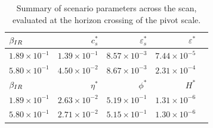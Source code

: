 
\begin{table}[h!]
  \begin{center}
    \begin{tabular}{lrrrr}
        \toprule
        $\beta_{IR}$ &    $c_s^{*}$ &  $\varepsilon_s^{*}$ &   $\varepsilon^{*}$ \\
        \midrule
        $1.89\times 10^{-1}$  &  $1.39\times 10^{-1}$  &  $  8.57\times 10^{-3}$  &  $7.44\times 10^{-5}$  \\
        $5.80\times 10^{-1}$  &  $4.50\times 10^{-2}$  &  $  8.67\times 10^{-3}$  &  $2.31\times 10^{-4}$  \\
        \bottomrule
        $\beta_{IR}$ &    $\eta^{*}$ &  $\phi^{*}$ &     $H^{*}$ \\
        \midrule
        $1.89\times 10^{-1}$  &  $2.63\times 10^{-2}$ &  $5.19\times 10^{-1}$  &  $1.31\times 10^{-6}$\\
        $5.80\times 10^{-1}$  &  $2.71\times 10^{-2}$ &  $5.15\times 10^{-1}$  &  $1.30\times 10^{-6}$\\
        \bottomrule
    \end{tabular}
    \caption{
        Summary of scenario parameters across the scan, evaluated at the horizon
      crossing of the pivot scale.
      }\label{tab:scan_summary_sr}
  \end{center}
\end{table}




